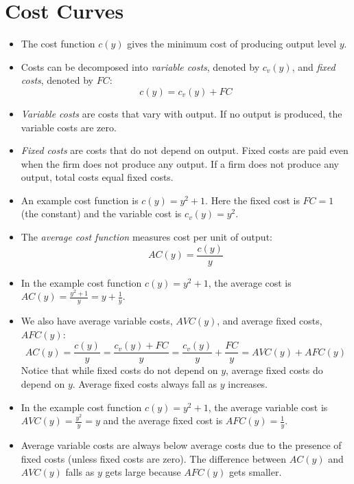 \documentclass{article}
\begin{document}
\section{Cost Curves}
\begin{itemize}
  \item The cost function $c\left( y \right)$ gives the minimum cost of producing output level $y$.
  \item Costs can be decomposed into \emph{variable costs}, denoted by $c_v\left( y \right)$, and \emph{fixed costs}, denoted by $FC$:
    \[c\left( y \right)= c_v\left( y \right)+FC\]
  \item \emph{Variable costs} are costs that vary with output. If no output is produced, the variable costs are zero.
  \item \emph{Fixed costs} are costs that do not depend on output. Fixed costs are paid even when the firm does not produce any output. If a firm does not produce any output, total costs equal fixed costs.
  \item An example cost function is $c\left( y \right)=y^2+1$. Here the fixed cost is $FC=1$ (the constant) and the variable cost is $c_v\left( y \right)=y^2$.
  \item The \emph{average cost function} measures cost per unit of output:
  \[AC\left(
y \right)=\frac{c\left( y \right)}{y}\]
  \item In the example cost function $c\left( y \right)=y^2+1$, the average cost is $AC\left( y \right)=\frac{y^2+1}{y}=y+\frac{1}{y}$.
  \item We also have average variable costs, $AVC\left( y \right)$, and average fixed costs, $AFC\left( y \right)$:
    \[
    AC\left( y \right) = \frac{c\left( y \right)}{y}=\frac{c_v\left( y
    \right)+FC}{y} = \frac{c_v\left( y \right)}{y} + \frac{FC}{y} = AVC\left(
    y \right) + AFC\left( y \right)
    \]
    Notice that while fixed costs do not depend on $y$, average fixed costs do depend on $y$. Average fixed costs always fall as $y$ increases.
  \item In the example cost function $c\left( y \right)=y^2+1$,  the average variable cost is $AVC\left( y \right)=\frac{y^2}{y}=y$ and the average fixed cost is $AFC\left( y \right)=\frac{1}{y}$.
  \item Average variable costs are always below average costs due to the presence of fixed costs (unless fixed costs are zero). The difference between $AC\left( y \right)$ and $AVC\left( y \right)$ falls as $y$ gets large because $AFC\left( y \right)$ gets smaller.
\end{itemize}
\end{document}
